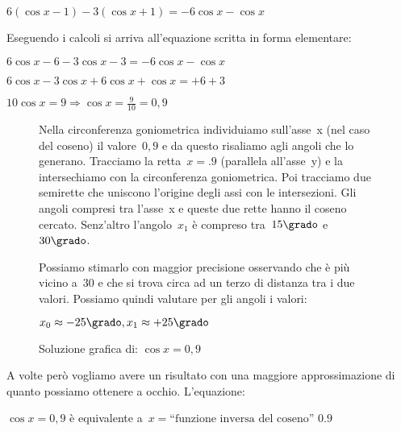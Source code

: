  \begin{esempio}
  $6 ( \cos x -1) -3 ( \cos x +1) = -6 \cos x - \cos x$
  
  Eseguendo i calcoli si arriva all'equazione scritta in forma elementare:
  
  $6 \cos x -6 -3 \cos x -3 = -6 \cos x - \cos x$
  
  $6 \cos x -3 \cos x +6 \cos x + \cos x = +6 +3$
  
  $10 \cos x= 9 \Rightarrow \cos x = \frac{9}{10} = 0,9$


 \begin{figure}[!h]
 \vspace{-6pt}
 \begin{minipage}{.50\textwidth}
Nella circonferenza goniometrica individuiamo sull'asse~x (nel caso del 
coseno) il valore~$0,9$ e da questo risaliamo agli angoli che lo generano.
Tracciamo la retta~$x=.9$ (parallela all'asse~y) e la intersechiamo con
la circonferenza goniometrica. Poi tracciamo due semirette che uniscono 
l'origine degli assi con le intersezioni. Gli angoli compresi tra l'asse~x 
e queste due rette hanno il coseno cercato. Senz'altro l'angolo~$x_1$ è 
compreso tra~$15\grado$ e~$30\grado$.

Possiamo stimarlo con maggior precisione osservando che è più vicino a~$30$ 
e che si trova circa ad un terzo di distanza tra i due valori. 
Possiamo quindi valutare per gli angoli i valori:

$x_0 \approx -25\grado, x_1 \approx +25\grado$
 \end{minipage}
 \begin{minipage}{.45\textwidth}
  \begin{center}
\begin{inaccessibleblock}[Soluzione grafica approssimata dell'equazione: 
    $\cos x = 0,8$.]
    
    \caption{Soluzione grafica di: $\cos x = 0,9$}
    \label{fig:trigo_equazione04}
\end{inaccessibleblock}
  \end{center}
 \end{minipage}
\vspace{-18pt}
\end{figure}
 
 \end{esempio}

A volte però vogliamo avere un risultato con una maggiore approssimazione di 
quanto possiamo ottenere a occhio. L'equazione:

$\cos x = 0,9$ è equivalente 
a~$x = \text{``funzione inversa del coseno'' } 0.9$

